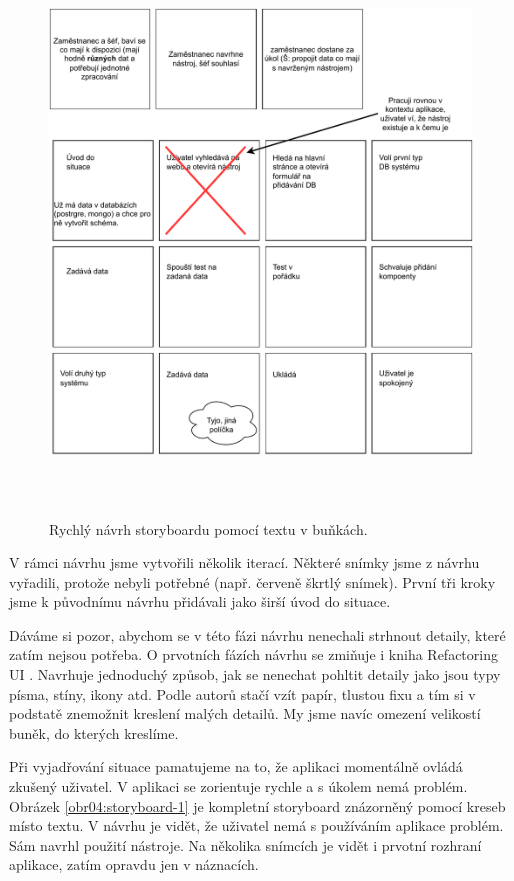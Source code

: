 \begin{figure}[htb]
    \centering
    \includegraphics[height=150mm]{../img/storyboard-1-rychly-navrh}
    \caption{Rychlý návrh storyboardu pomocí textu v buňkách.}
    \label{obr04:storyboard-1-text}
\end{figure}

V rámci návrhu jsme vytvořili několik iterací. Některé snímky jsme z návrhu vyřadili, protože nebyli potřebné (např. červeně škrtlý snímek). První tři kroky jsme k původnímu návrhu přidávali jako širší úvod do situace.

Dáváme si pozor, abychom se v této fázi návrhu nenechali strhnout detaily, které zatím nejsou potřeba. O prvotních fázích návrhu se zmiňuje i kniha Refactoring UI \cite{Refactoring_UI}. Navrhuje jednoduchý způsob, jak se nenechat pohltit detaily jako jsou typy písma, stíny, ikony atd. Podle autorů stačí vzít papír, tlustou fixu a tím si v podstatě znemožnit kreslení malých detailů. My jsme navíc omezení velikostí buněk, do kterých kreslíme.

Při vyjadřování situace pamatujeme na to, že aplikaci momentálně ovládá zkušený uživatel. V  aplikaci se zorientuje rychle a s úkolem nemá problém. Obrázek \ref{obr04:storyboard-1} je kompletní storyboard znázorněný pomocí kreseb místo textu. V návrhu je vidět, že uživatel nemá s používáním aplikace problém. Sám navrhl použití nástroje. Na několika snímcích je vidět i prvotní rozhraní aplikace, zatím opravdu jen v náznacích.

